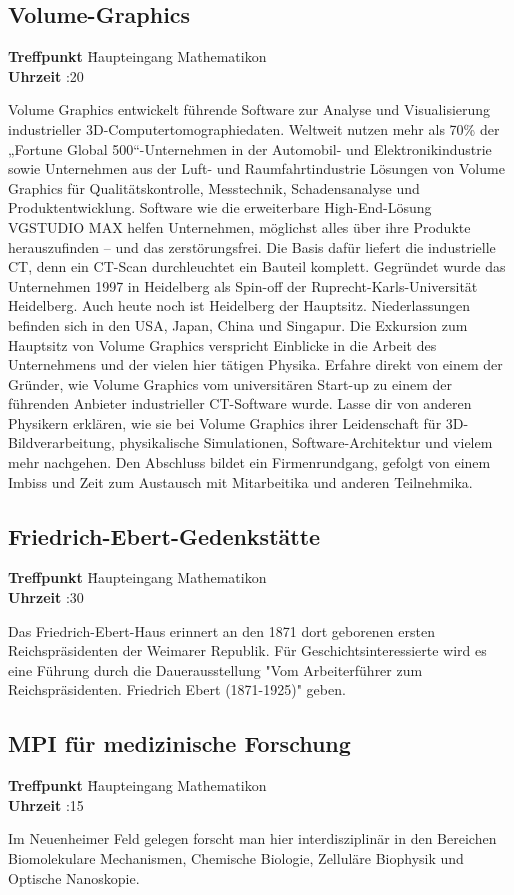 \subsection*{Volume-Graphics}
\begin{tabbing}
\textbf{Treffpunkt} \quad \quad \quad \= Haupteingang Mathematikon\\
\textbf{Uhrzeit} :20
\end{tabbing}
Volume Graphics entwickelt führende Software zur Analyse und Visualisierung industrieller 3D-Computertomographiedaten. Weltweit nutzen mehr als 70\% der „Fortune Global 500“-Unternehmen in der Automobil- und Elektronikindustrie sowie Unternehmen aus der Luft- und Raumfahrtindustrie Lösungen von Volume Graphics für Qualitätskontrolle, Messtechnik, Schadensanalyse und Produktentwicklung. Software wie die erweiterbare High-End-Lösung VGSTUDIO MAX helfen Unternehmen, möglichst alles über ihre Produkte herauszufinden – und das zerstörungsfrei. Die Basis dafür liefert die industrielle CT, denn ein CT-Scan durchleuchtet ein Bauteil komplett. Gegründet wurde das Unternehmen 1997 in Heidelberg als Spin-off der Ruprecht-Karls-Universität Heidelberg. Auch heute noch ist Heidelberg der Hauptsitz. Niederlassungen befinden sich in den USA, Japan, China und Singapur. Die Exkursion zum Hauptsitz von Volume Graphics verspricht Einblicke in die Arbeit des Unternehmens und der vielen hier tätigen Physika. Erfahre direkt von einem der Gründer, wie Volume Graphics vom universitären Start-up zu einem der führenden Anbieter industrieller CT-Software wurde. Lasse dir von anderen Physikern erklären, wie sie bei Volume Graphics ihrer Leidenschaft für 3D-Bildverarbeitung, physikalische Simulationen, Software-Architektur und vielem mehr nachgehen. Den Abschluss bildet ein Firmenrundgang, gefolgt von einem Imbiss und Zeit zum Austausch mit Mitarbeitika und anderen Teilnehmika. 

\subsection*{Friedrich-Ebert-Gedenkstätte}
\begin{tabbing}
\textbf{Treffpunkt} \quad \quad \quad \= Haupteingang Mathematikon\\
\textbf{Uhrzeit} :30
\end{tabbing}
Das Friedrich-Ebert-Haus erinnert an den 1871 dort geborenen ersten Reichspräsidenten der Weimarer Republik. Für Geschichtsinteressierte wird es eine Führung durch die Dauerausstellung "Vom Arbeiterführer zum Reichspräsidenten. Friedrich Ebert (1871-1925)" geben.

\subsection*{MPI für medizinische Forschung}
\begin{tabbing}
\textbf{Treffpunkt} \quad \quad \quad \= Haupteingang Mathematikon\\
\textbf{Uhrzeit} :15
\end{tabbing}
Im Neuenheimer Feld gelegen forscht man hier interdisziplinär in den Bereichen Biomolekulare Mechanismen, Chemische Biologie, Zelluläre Biophysik und Optische Nanoskopie. 